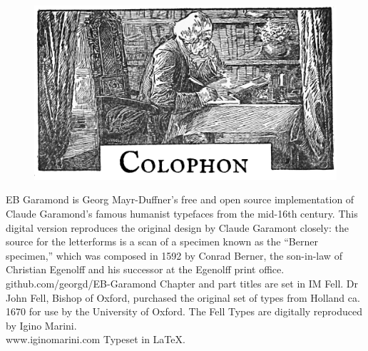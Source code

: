 \documentclass[
paper=a5,
BCOR=7mm,
twoside,
DIV=calc,
12pt,
usegeometry,
chapterprefix,
headings=big]{scrbook} %
\begin{document}











\clearpage
{}
\begin{figure}[t!]
\centering
\includegraphics[width=\linewidth]{colophon}
\end{figure}
\centering
EB Garamond is Georg Mayr-Duffner's free and open source implementation of Claude Garamond’s famous humanist typefaces from the mid-16th century. This digital version reproduces the original design by Claude Garamont closely: the source for the letterforms is a scan of a specimen known as the \enquote{Berner specimen,} which was composed in 1592 by Conrad Berner, the son-in-law of Christian Egenolff and his successor at the Egenolff print office.  \\github.com/georgd/EB-Garamond
\vfill
Chapter and part titles are set in IM Fell. Dr John Fell, Bishop of Oxford, purchased the original set of types from Holland ca. 1670 for use by the University of Oxford. The Fell Types are digitally reproduced by Igino Marini. \\www.iginomarini.com
\vfill
Typeset in \LaTeX{}.
\thispagestyle{empty}
\end{document}
